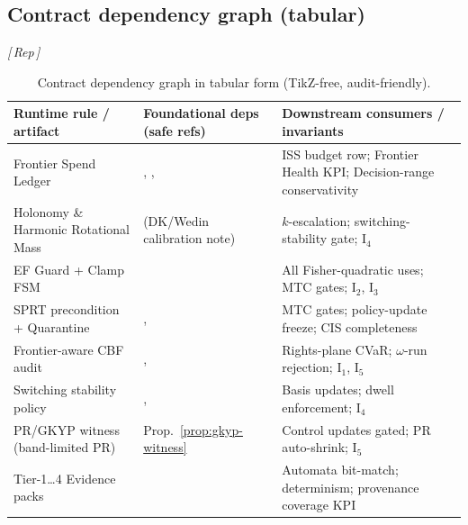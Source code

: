 \documentclass[10pt]{article}
\makeatletter
\newcommand{\layertag}[1]{\textsf{\footnotesize[\,#1\,]}}
\newcommand{\JSGxrefDual}[3]{%
  \@ifundefined{r@#3}{%
    \@ifundefined{r@#1-#3}{\textbf{[#2 ??]}}{#2~\ref{#1-#3}}%
  }{#2~\ref{#3}}%
}
\newcommand{\jsgiLem}[1]{\JSGxrefDual{JSGI}{JSGI Lemma}{#1}}
\newcommand{\jsgiThm}[1]{\JSGxrefDual{JSGI}{JSGI Theorem}{#1}}
\newcommand{\jsgiiLem}[1]{\JSGxrefDual{JSGII}{JSGII Lemma}{#1}}
\newcommand{\jsgiiThm}[1]{\JSGxrefDual{JSGII}{JSGII Theorem}{#1}}
\newcommand{\jsgiiDef}[1]{\JSGxrefDual{JSGII}{JSGII Definition}{#1}}
\newcommand{\jsgiiSec}[1]{\JSGxrefDual{JSGII}{JSGII §}{#1}}
\def\lblNoZeno{lem:no-zeno}
\def\lblJacobiDefect{lem:jacobi-defect}
\def\lblISS{thm:iss-passivity}
\def\lblEFradius{thm:ef-kl-cumulant}
\def\lblDROenv{thm:dro-envelope}
\def\lblQuarantine{def:window-quarantine}
\def\lblSaltation{lem:numeric-saltation}
\def\lblCBFfrontier{lem:frontier-cbf}
\def\lblGapGate{lem:gap-gate}
\def\lblSwitchStab{thm:switching-stability}
\def\lblSchemas{sec:artifact-schemas}
\makeatother
\begin{document}
\subsection{Contract dependency graph (tabular)}\label{app:resolution-deps}
\emph{\layertag{Rep}}
\begin{table}[h]
\centering
\renewcommand{\arraystretch}{1.12}
\begin{tabularx}{\textwidth}{@{}>{\raggedright\arraybackslash}p{3.7cm} >{\raggedright\arraybackslash}X >{\raggedright\arraybackslash}X@{}}
\toprule
\textbf{Runtime rule / artifact} & \textbf{Foundational deps (safe refs)} & \textbf{Downstream consumers / invariants} \\
\midrule
Frontier Spend Ledger &
\jsgiLem{\lblNoZeno}, \jsgiLem{\lblJacobiDefect}, \jsgiThm{\lblISS} &
ISS budget row; Frontier Health KPI; Decision-range conservativity \\
Holonomy \& Harmonic Rotational Mass &
\jsgiiSec{\lblSchemas} (DK/Wedin calibration note) &
$k$-escalation; switching-stability gate; I\(_4\) \\
EF Guard + Clamp FSM &
\jsgiiThm{\lblEFradius} &
All Fisher-quadratic uses; MTC gates; I\(_2\), I\(_3\) \\
SPRT precondition + Quarantine &
\jsgiiThm{\lblDROenv}, \jsgiiDef{\lblQuarantine} &
MTC gates; policy-update freeze; CIS completeness \\
Frontier-aware CBF audit &
\jsgiiLem{\lblSaltation}, \jsgiiLem{\lblCBFfrontier} &
Rights-plane CVaR; $\omega$-run rejection; I\(_1\), I\(_5\) \\
Switching stability policy &
\jsgiiLem{\lblGapGate}, \jsgiiThm{\lblSwitchStab} &
Basis updates; dwell enforcement; I\(_4\) \\
PR/GKYP witness (band-limited PR) &
Prop.~\ref{prop:gkyp-witness} &
Control updates gated; PR auto-shrink; I\(_5\) \\
Tier-1…4 Evidence packs &
\jsgiiSec{\lblSchemas} &
Automata bit-match; determinism; provenance coverage KPI \\
\bottomrule
\end{tabularx}
\caption{Contract dependency graph in tabular form (TikZ-free, audit-friendly).}
\label{tab:contract-deps}
\end{table}
\end{document}
